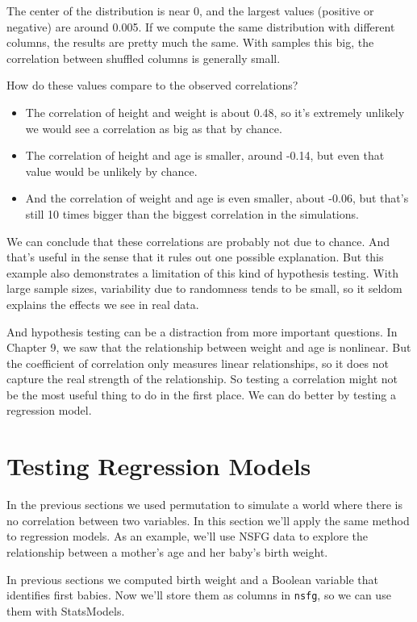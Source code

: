 The center of the distribution is near 0, and the largest values
(positive or negative) are around 0.005. If we compute the same
distribution with different columns, the results are pretty much the
same. With samples this big, the correlation between shuffled columns is
generally small.

How do these values compare to the observed correlations?

\begin{itemize}
\item
  The correlation of height and weight is about 0.48, so it's extremely
  unlikely we would see a correlation as big as that by chance.
\item
  The correlation of height and age is smaller, around -0.14, but even
  that value would be unlikely by chance.
\item
  And the correlation of weight and age is even smaller, about -0.06,
  but that's still 10 times bigger than the biggest correlation in the
  simulations.
\end{itemize}

We can conclude that these correlations are probably not due to chance.
And that's useful in the sense that it rules out one possible
explanation. But this example also demonstrates a limitation of this
kind of hypothesis testing. With large sample sizes, variability due to
randomness tends to be small, so it seldom explains the effects we see
in real data.

And hypothesis testing can be a distraction from more important
questions. In Chapter 9, we saw that the relationship between weight and
age is nonlinear. But the coefficient of correlation only measures
linear relationships, so it does not capture the real strength of the
relationship. So testing a correlation might not be the most useful
thing to do in the first place. We can do better by testing a regression
model.

\section{Testing Regression Models}\label{testing-regression-models}

In the previous sections we used permutation to simulate a world where
there is no correlation between two variables. In this section we'll
apply the same method to regression models. As an example, we'll use
NSFG data to explore the relationship between a mother's age and her
baby's birth weight.

In previous sections we computed birth weight and a Boolean variable
that identifies first babies. Now we'll store them as columns in
\passthrough{\lstinline!nsfg!}, so we can use them with StatsModels.

